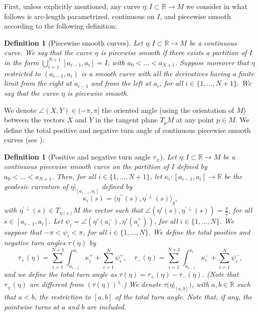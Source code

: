 \documentclass{article}
\newcommand{\R}{\mathbb{R}}
\newcommand{\surf}{M}
\newcommand{\ko}{\kappa}
\newtheorem{definitionE}[theorem]{Definition}
\theoremstyle{remark}
\theoremstyle{prpart}
\begin{document}
 First, unless explicitly mentioned, any curve $\eta:I\subset \R\to\surf$ we consider in what follows is arc-length parametrized, continuous on $I$, and piecewise smooth according to the following definition:
\begin{definitionE}[Piecewise smooth curves]\label{def:piecewise}
  Let $\eta:I\subset \R\to\surf$ be a continuous curve. We say that the curve $\eta$ is \emph{piecewise smooth} if there exists a partition of $I$ in the form $\bigcup_{i=1}^{N+1} [a_{i-1},a_i]=I$, with $a_0<...<a_{N+1}$. Suppose moreover that $\eta$ restricted to $(a_{i-1},a_{i})$ is a smooth curve with all the derivatives having a finite limit from the right at $a_{i-1}$ and from the left at $a_{i}$, for all $i\in\{1,...,N+1\}$. We say that the curve $\eta$ is piecewise smooth.
\end{definitionE}
 We denote $\angle(X,Y)\in(-\pi,\pi]$ the oriented angle (using the orientation of $\surf$) between the vectors $X$ and $Y$ in the tangent plane $T_p\surf$ at any point $p\in\surf$. We define the total positive and negative turn angle of continuous piecewise smooth curves (see \cite{Bur05}):
\begin{definitionE}[Positive and negative turn angle $\tau_\pm$]
 Let $\eta:I\subset\R\to\surf$ be a continuous piecewise smooth curve on the partition of $I$ defined by $a_0<...<a_{N+1}$. Then, for all $i\in\{1,...,N+1\}$, let $\ko_i:[a_{i-1},a_{i}]\to\R$ be the geodesic curvature of $\eta\big|_{[a_{i-1},a_{i}]}$ defined by 
\begin{equation*}
  \ko_i(s) = \langle \eta^{\prime\prime}(s), \eta^{\prime\perp}(s)\rangle_g,
\end{equation*}
with $\eta^{\prime\perp}(s)\in T_{\eta(s)}\surf$ the vector such that $\angle(\eta'(s),\eta^{\prime\perp}(s))=\frac{\pi}{2}$, for all $s\in [a_{i-1},a_{i}]$.
Let $\psi_i = \angle(\eta'(a_i^-),\eta'(a_i^+))$, for all $i\in\{1,...,N\}$. We suppose that $-\pi<\psi_i<\pi$, for all $i\in\{1,...,N\}$. We define the total positive and negative \emph{turn angles} $\tau(\eta)$ by
\begin{equation}\label{eq:int-curv}
\tau_+(\eta) = \sum_{i=1}^{N+1}\int_{a_{i-1}}^{a_{i}}\ko_i^+ + \sum_{i=1}^N\psi_i^+,
\quad \tau_-(\eta) = \sum_{i=1}^{N+1}\int_{a_{i-1}}^{a_{i}}\ko_i^- + \sum_{i=1}^N\psi_i^-,
\end{equation}
and we define the total \emph{turn angle} as $\tau(\eta) = \tau_+(\eta)-\tau_-(\eta)$. (Note that $\tau_{\pm}(\eta)$ are different from $(\tau(\eta))^\pm$.) We denote $\tau\big(\eta\big|_{[a,b]})$, with $a,b\in\R$ such that $a<b$, the restriction to $[a,b]$ of the total turn angle. Note that, if any, the pointwise turns at $a$ and $b$ are included.
\end{definitionE}
\end{document}
